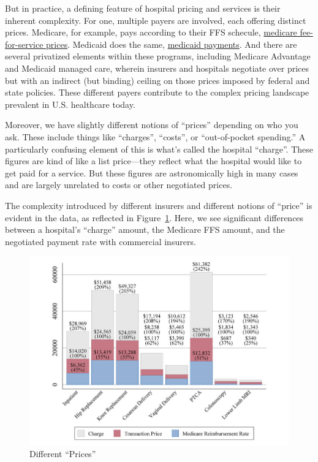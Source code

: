 \documentclass[
  letterpaper,
  DIV=11,
  numbers=noendperiod]{scrreport}
\theoremstyle{definition}
\theoremstyle{remark}
\begin{document}
But in practice, a defining feature of hospital pricing and services is
their inherent complexity. For one, multiple payers are involved, each
offering distinct prices. Medicare, for example, pays according to their
FFS schecule,
\href{https://www.cms.gov/Outreach-and-Education/Medicare-Learning-Network-MLN/MLNProducts/Downloads/AcutePaymtSysfctsht.pdf}{medicare
fee-for-service prices}. Medicaid does the same,
\href{https://www.kff.org/report-section/understanding-medicaid-hospital-payments-and-the-impact-of-recent-policy-changes-issue-brief/}{medicaid
payments}. And there are several privatized elements within these
programs, including Medicare Advantage and Medicaid managed care,
wherein insurers and hospitals negotiate over prices but with an
indirect (but binding) ceiling on those prices imposed by federal and
state policies. These different payers contribute to the complex pricing
landscape prevalent in U.S. healthcare today.

Moreover, we have slightly different notions of ``prices'' depending on
who you ask. These include things like ``charges'', ``costs'', or
``out-of-pocket spending.'' A particularly confusing element of this is
what's called the hospital ``charge''. These figures are kind of like a
list price---they reflect what the hospital would like to get paid for a
service. But these figures are astronomically high in many cases and are
largely unrelated to costs or other negotiated prices.

The complexity introduced by different insurers and different notions of
``price'' is evident in the data, as reflected in
Figure~\ref{fig-prices-payer}. Here, we see significant differences
between a hospital's ``charge'' amount, the Medicare FFS amount, and the
negotiated payment rate with commercial insurers.

\begin{figure}

{\centering \includegraphics{part3/../figures/DifferentPrices.jpg}

}

\caption{\label{fig-prices-payer}Different ``Prices''}

\end{figure}
\end{document}
